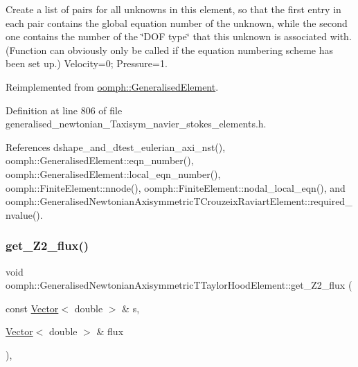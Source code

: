 Create a list of pairs for all unknowns in this element, so that the first entry in each pair contains the global equation number of the unknown, while the second one contains the number of the \char`\"{}\+D\+O\+F type\char`\"{} that this unknown is associated with. (Function can obviously only be called if the equation numbering scheme has been set up.) Velocity=0; Pressure=1. 



Reimplemented from \hyperlink{classoomph_1_1GeneralisedElement_a069f59bfc3e607a5bebba52c6314d777}{oomph\+::\+Generalised\+Element}.



Definition at line 806 of file generalised\+\_\+newtonian\+\_\+\+Taxisym\+\_\+navier\+\_\+stokes\+\_\+elements.\+h.



References dshape\+\_\+and\+\_\+dtest\+\_\+eulerian\+\_\+axi\+\_\+nst(), oomph\+::\+Generalised\+Element\+::eqn\+\_\+number(), oomph\+::\+Generalised\+Element\+::local\+\_\+eqn\+\_\+number(), oomph\+::\+Finite\+Element\+::nnode(), oomph\+::\+Finite\+Element\+::nodal\+\_\+local\+\_\+eqn(), and oomph\+::\+Generalised\+Newtonian\+Axisymmetric\+T\+Crouzeix\+Raviart\+Element\+::required\+\_\+nvalue().

\mbox{\label{classoomph_1_1GeneralisedNewtonianAxisymmetricTTaylorHoodElement_ae82615d8eb1595a83abceddf43366dbf}} 
\subsubsection{\texorpdfstring{get\+\_\+\+Z2\+\_\+flux()}{get\_Z2\_flux()}}
{\footnotesize\ttfamily void oomph\+::\+Generalised\+Newtonian\+Axisymmetric\+T\+Taylor\+Hood\+Element\+::get\+\_\+\+Z2\+\_\+flux (\begin{DoxyParamCaption}\item[{const \hyperlink{classoomph_1_1Vector}{Vector}$<$ double $>$ \&}]{s,  }\item[{\hyperlink{classoomph_1_1Vector}{Vector}$<$ double $>$ \&}]{flux }\end{DoxyParamCaption})\hspace{0.3cm}{\ttfamily [inline]}, {\ttfamily [virtual]}}



